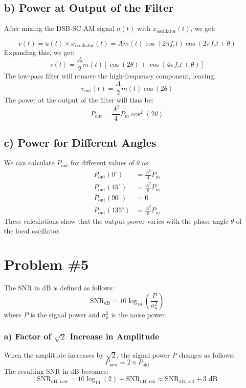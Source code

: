 \documentclass{article}
\begin{document}
\subsection*{b) Power at Output of the Filter}
After mixing the DSB-SC AM signal \( u(t) \) with \( x_{\text{oscillator}}(t) \), we get:

\[
v(t) = u(t) \times x_{\text{oscillator}}(t) = A m(t) \cos(2\pi f_c t) \cos(2\pi f_c t + \theta)
\]
Expanding this, we get:
\[
v(t) = \frac{A}{2} m(t) \left[ \cos(2\theta) + \cos(4\pi f_c t + \theta) \right]
\]
The low-pass filter will remove the high-frequency component, leaving:
\[
v_{\text{out}}(t) = \frac{A}{2} m(t) \cos(2\theta)
\]
The power at the output of the filter will thus be:
\[
P_{\text{out}} = \frac{A^2}{4} P_m \cos^2(2\theta)
\]

\subsection*{c) Power for Different Angles}
We can calculate \( P_{\text{out}} \) for different values of \( \theta \) as:
\[
\begin{aligned}
    P_{\text{out}}(0^\circ) &= \frac{A^2}{4} P_m \\
    P_{\text{out}}(45^\circ) &= \frac{A^2}{8} P_m \\
    P_{\text{out}}(90^\circ) &= 0 \\
    P_{\text{out}}(135^\circ) &= \frac{A^2}{8} P_m
\end{aligned}
\]
These calculations show that the output power varies with the phase angle \( \theta \) of the local oscillator.


\newpage
\section*{Problem \#5}

The SNR in dB is defined as follows:
\[
\text{SNR}_{\text{dB}} = 10 \log_{10} \left( \frac{P}{\sigma_n^2} \right)
\]
where \(P\) is the signal power and \(\sigma_n^2\) is the noise power.

\subsubsection*{a) Factor of \( \sqrt{2} \) Increase in Amplitude}

When the amplitude increases by \( \sqrt{2} \), the signal power \(P\) changes as follows:
\[
P_{\text{new}} = 2 \times P_{\text{old}}
\]
The resulting SNR in dB becomes:
\[
\text{SNR}_{\text{dB, new}} = 10 \log_{10} (2) + \text{SNR}_{\text{dB, old}} \approx \text{SNR}_{\text{dB, old}} + 3 \text{ dB}
\]
\end{document}
